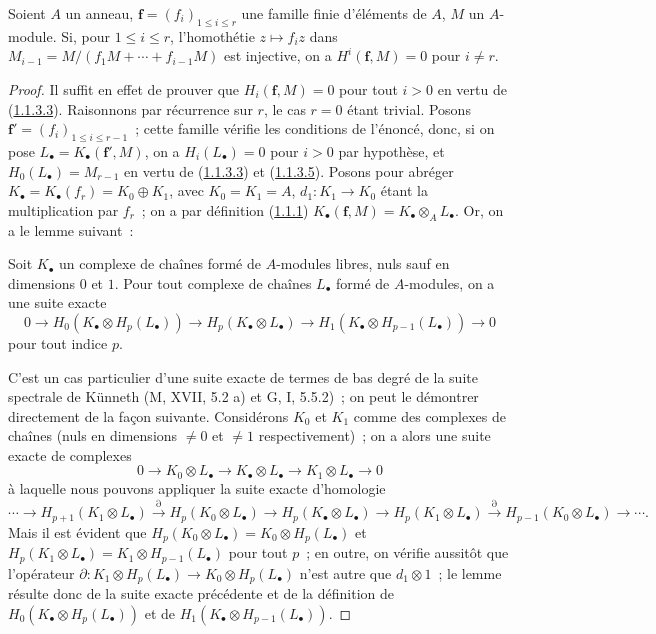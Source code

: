\begin{proposition}[1.1.4]
\label{III.1.1.4-fr}
Soient $A$ un anneau, $\mathbf f=(f_i)_{1\leq i\leq r}$ une famille finie
d'éléments de $A$, $M$ un $A$-module. Si, pour $1\leq i\leq r$, l'homothétie
$z\mapsto f_i z$ dans $M_{i-1}=M/(f_1M+\cdots+f_{i-1}M)$ est injective, on a
$H^i(\mathbf f,M)=0$ pour $i\neq r$.
\end{proposition}

\begin{proof}
Il suffit en effet de prouver que $H_i(\mathbf f,M)=0$ pour tout $i>0$ en
vertu de (\hyperref[III.1.1.3.3-fr]{1.1.3.3}). Raisonnons par récurrence sur
$r$, le cas $r=0$ étant trivial. Posons
$\mathbf f'=(f_i)_{1\leq i\leq r-1}$~; cette famille vérifie les conditions de
l'énoncé, donc, si on pose $L_\bullet=K_\bullet(\mathbf f',M)$, on a
$H_i(L_\bullet)=0$ pour $i>0$ par hypothèse, et
$H_0(L_\bullet)=M_{r-1}$ en vertu de
(\hyperref[III.1.1.3.3-fr]{1.1.3.3}) et
(\hyperref[III.1.1.3.5-fr]{1.1.3.5}). Posons pour abréger
$K_\bullet=K_\bullet(f_r)=K_0\oplus K_1$, avec $K_0=K_1=A$,
$d_1:K_1\to K_0$ étant la multiplication par $f_r$~; on a par définition
(\hyperref[III.1.1.1-fr]{1.1.1})
$K_\bullet(\mathbf f,M)=K_\bullet\otimes_A L_\bullet$. Or, on a le lemme
suivant~:

\begin{lemma}[1.1.4.1]
\label{III.1.1.4.1-fr}
Soit $K_\bullet$ un complexe de chaînes formé de $A$-modules libres, nuls sauf
en dimensions $0$ et $1$. Pour tout complexe de chaînes $L_\bullet$ formé de
$A$-modules, on a une suite exacte
\[
0\longrightarrow H_0(K_\bullet\otimes H_p(L_\bullet))
\longrightarrow H_p(K_\bullet\otimes L_\bullet)
\longrightarrow H_1(K_\bullet\otimes H_{p-1}(L_\bullet))
\longrightarrow0
\]
pour tout indice $p$.
\end{lemma}

C'est un cas particulier d'une suite exacte de termes de bas degré de la
suite spectrale de Künneth (M, XVII, 5.2 a) et G, I, 5.5.2)~; on peut le
démontrer directement de la façon suivante. Considérons $K_0$ et $K_1$ comme
des complexes de chaînes (nuls en dimensions $\neq0$ et $\neq1$
respectivement)~; on a alors une suite exacte de complexes
\[
0\longrightarrow K_0\otimes L_\bullet
\longrightarrow K_\bullet\otimes L_\bullet
\longrightarrow K_1\otimes L_\bullet\longrightarrow0
\]
à laquelle nous pouvons appliquer la suite exacte d'homologie
\[
\cdots\longrightarrow H_{p+1}(K_1\otimes L_\bullet)
\xrightarrow{\partial}H_p(K_0\otimes L_\bullet)
\longrightarrow H_p(K_\bullet\otimes L_\bullet)
\longrightarrow H_p(K_1\otimes L_\bullet)
\xrightarrow{\partial}H_{p-1}(K_0\otimes L_\bullet)
\longrightarrow\cdots.
\]
Mais il est évident que
$H_p(K_0\otimes L_\bullet)=K_0\otimes H_p(L_\bullet)$ et
$H_p(K_1\otimes L_\bullet)=K_1\otimes H_{p-1}(L_\bullet)$ pour tout $p$~; en
outre, on vérifie aussitôt que l'opérateur
$\partial:K_1\otimes H_p(L_\bullet)\to K_0\otimes H_p(L_\bullet)$ n'est autre
que $d_1\otimes1$~; le lemme résulte donc de la suite exacte précédente et de
la définition de $H_0(K_\bullet\otimes H_p(L_\bullet))$ et de
$H_1(K_\bullet\otimes H_{p-1}(L_\bullet))$.


\end{proof}

